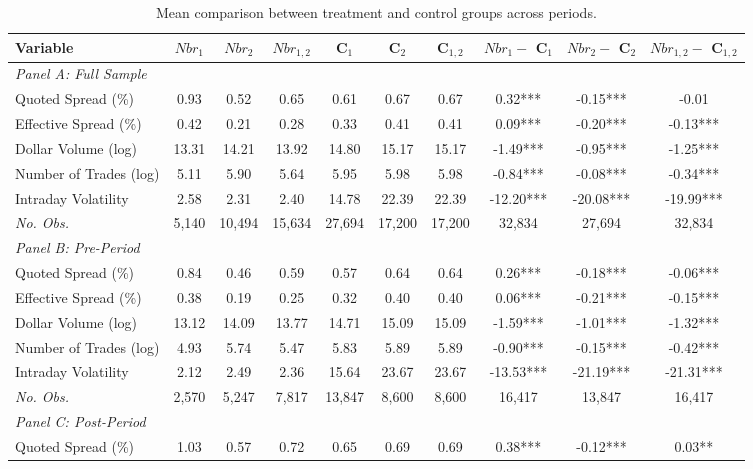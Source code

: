 \begin{table}[!htp]
 \centering
 \caption{Mean comparison between treatment and control groups across periods.}
 \label{tab:mean_comparisons_psm}
 \begin{adjustbox}{max width=\textwidth}
 \scriptsize
 \begin{tabular}{lccccccccc}
 \toprule
 Variable & $Nbr_1$ & $Nbr_2$ & $Nbr_{1, 2}$ & C$_1$ & C$_2$ & C$_{1, 2}$ & $Nbr_1 - $ C$_1$ & $Nbr_2 - $ C$_2$ & $Nbr_{1, 2} - $ C$_{1, 2}$ \\
 \midrule
\textit{Panel A: Full Sample} \\
\cmidrule{1-10}
Quoted Spread (\%) & 0.93 & 0.52 & 0.65 & 0.61 & 0.67 & 0.67 & 0.32*** & -0.15*** & -0.01 \\
Effective Spread (\%) & 0.42 & 0.21 & 0.28 & 0.33 & 0.41 & 0.41 & 0.09*** & -0.20*** & -0.13*** \\
Dollar Volume (log) & 13.31 & 14.21 & 13.92 & 14.80 & 15.17 & 15.17 & -1.49*** & -0.95*** & -1.25*** \\
Number of Trades (log) & 5.11 & 5.90 & 5.64 & 5.95 & 5.98 & 5.98 & -0.84*** & -0.08*** & -0.34*** \\
Intraday Volatility & 2.58 & 2.31 & 2.40 & 14.78 & 22.39 & 22.39 & -12.20*** & -20.08*** & -19.99*** \\
\textit{No. Obs.} &  5,140  &  10,494  &  15,634  &  27,694  &  17,200  &  17,200  &  32,834  &  27,694  &  32,834  \\
\cmidrule{1-10}
\textit{Panel B: Pre-Period} \\
\cmidrule{1-10}
Quoted Spread (\%) & 0.84 & 0.46 & 0.59 & 0.57 & 0.64 & 0.64 & 0.26*** & -0.18*** & -0.06*** \\
Effective Spread (\%) & 0.38 & 0.19 & 0.25 & 0.32 & 0.40 & 0.40 & 0.06*** & -0.21*** & -0.15*** \\
Dollar Volume (log) & 13.12 & 14.09 & 13.77 & 14.71 & 15.09 & 15.09 & -1.59*** & -1.01*** & -1.32*** \\
Number of Trades (log) & 4.93 & 5.74 & 5.47 & 5.83 & 5.89 & 5.89 & -0.90*** & -0.15*** & -0.42*** \\
Intraday Volatility & 2.12 & 2.49 & 2.36 & 15.64 & 23.67 & 23.67 & -13.53*** & -21.19*** & -21.31*** \\
\textit{No. Obs.} &  2,570  &  5,247  &  7,817  &  13,847  &  8,600  &  8,600  &  16,417  &  13,847  &  16,417  \\
\cmidrule{1-10}
\textit{Panel C: Post-Period} \\
\cmidrule{1-10}
Quoted Spread (\%) & 1.03 & 0.57 & 0.72 & 0.65 & 0.69 & 0.69 & 0.38*** & -0.12*** & 0.03** \\

\end{tabular}
\end{adjustbox}
\end{table}
